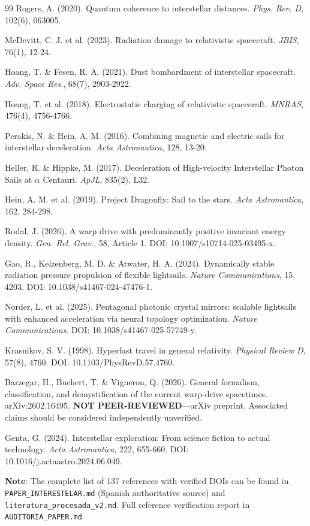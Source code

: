 \documentclass[11pt,a4paper,onecolumn]{article}
\begin{document}
\begin{thebibliography}{99}
 Rogers, A. (2020). Quantum coherence to interstellar distances. \textit{Phys. Rev. D}, 102(6), 063005.

 McDevitt, C. J. et al. (2023). Radiation damage to relativistic spacecraft. \textit{JBIS}, 76(1), 12-24.

 Hoang, T. \& Fesen, R. A. (2021). Dust bombardment of interstellar spacecraft. \textit{Adv. Space Res.}, 68(7), 2903-2922.

 Hoang, T. et al. (2018). Electrostatic charging of relativistic spacecraft. \textit{MNRAS}, 476(4), 4756-4766.

 Perakis, N. \& Hein, A. M. (2016). Combining magnetic and electric sails for interstellar deceleration. \textit{Acta Astronautica}, 128, 13-20.

 Heller, R. \& Hippke, M. (2017). Deceleration of High-velocity Interstellar Photon Sails at $\alpha$ Centauri. \textit{ApJL}, 835(2), L32.

 Hein, A. M. et al. (2019). Project Dragonfly: Sail to the stars. \textit{Acta Astronautica}, 162, 284-298.

 Rodal, J. (2026). A warp drive with predominantly positive invariant energy density. \textit{Gen. Rel. Grav.}, 58, Article 1. DOI: 10.1007/s10714-025-03495-x.

 Gao, R., Kelzenberg, M. D. \& Atwater, H. A. (2024). Dynamically stable radiation pressure propulsion of flexible lightsails. \textit{Nature Communications}, 15, 4203. DOI: 10.1038/s41467-024-47476-1.

 Norder, L. et al. (2025). Pentagonal photonic crystal mirrors: scalable lightsails with enhanced acceleration via neural topology optimization. \textit{Nature Communications}. DOI: 10.1038/s41467-025-57749-y.

 Krasnikov, S. V. (1998). Hyperfast travel in general relativity. \textit{Physical Review D}, 57(8), 4760. DOI: 10.1103/PhysRevD.57.4760.

 Barzegar, H., Buchert, T. \& Vigneron, Q. (2026). General formalism, classification, and demystification of the current warp-drive spacetimes. arXiv:2602.16495. \textbf{NOT PEER-REVIEWED}---arXiv preprint. Associated claims should be considered independently unverified.

 Genta, G. (2024). Interstellar exploration: From science fiction to actual technology. \textit{Acta Astronautica}, 222, 655-660. DOI: 10.1016/j.actaastro.2024.06.049.

\end{thebibliography}

\textbf{Note}: The complete list of 137 references with verified DOIs can be found in \texttt{PAPER\_INTERESTELAR.md} (Spanish authoritative source) and \texttt{literatura\_procesada\_v2.md}. Full reference verification report in \texttt{AUDITORIA\_PAPER.md}.
\end{document}
